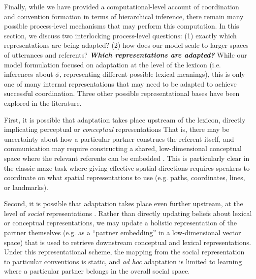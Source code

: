 Finally, while we have provided a computational-level account of coordination and convention formation in terms of hierarchical inference, there remain many possible process-level mechanisms that may perform this computation.
In this section, we discuss two interlocking process-level questions: (1) exactly which representations are being adapted? (2) how does our model scale to larger spaces of utterances and referents? %
\textbf{\textit{Which representations are adapted?}}
While our model formulation focused on adaptation at the level of the lexicon (i.e. inferences about $\phi$, representing different possible lexical meanings), this is only one of many internal representations that may need to be adapted to achieve successful coordination. 
Three other possible representational bases have been explored in the literature. 

First, it is possible that adaptation takes place upstream of the lexicon, directly implicating perceptual or \emph{conceptual} representations \cite{GarrodAnderson87_SayingWhatYouMean,HealeySwobodaUmataKing07_GraphicalLanguageGames}
That is, there may be uncertainty about how a particular partner construes the referent itself, and communication may require constructing a shared, low-dimensional conceptual space where the relevant referents can be embedded \cite{stolk2016conceptual}.
This is particularly clear in the classic maze task \cite{GarrodAnderson87_SayingWhatYouMean} where giving effective spatial directions requires speakers to coordinate on what spatial representations to use (e.g. paths, coordinates, lines, or landmarks). 

Second, it is possible that adaptation takes place even further upstream, at the level of \emph{social} representations \cite{jaech2018low}.
Rather than directly updating beliefs about lexical or conceptual representations, we may update a holistic representation of the partner themselves (e.g. as a ``partner embedding'' in a low-dimensional vector space) that is used to retrieve downstream conceptual and lexical representations. 
Under this representational scheme, the mapping from the social representation to particular conventions is static, and \emph{ad hoc} adaptation is limited to learning where a particular partner belongs in the overall social space.

